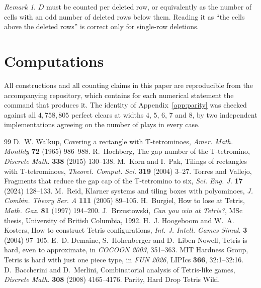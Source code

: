 \documentclass[11pt,a4paper]{article}
\theoremstyle{plain}
\theoremstyle{definition}
\theoremstyle{remark}
\newtheorem{remark}[theorem]{Remark}
\begin{document}
\begin{remark}
$D$ must be counted per deleted row, or equivalently as the number of cells with an
odd number of deleted rows below them. Reading it as ``the cells above the deleted
rows'' is correct only for single-row deletions.
\end{remark}

\section*{Computations}

All constructions and all counting claims in this paper are reproducible from the
accompanying repository, which contains for each numerical statement the command that
produces it. The identity of Appendix~\ref{app:parity} was checked against all
$4{,}758{,}805$ perfect clears at widths $4$, $5$, $6$, $7$ and $8$, by two independent
implementations agreeing on the number of plays in every case.

\begin{thebibliography}{99}
 D.~W. Walkup, Covering a rectangle with T-tetrominoes,
  \emph{Amer. Math. Monthly} \textbf{72} (1965) 986--988.
 R.~Hochberg, The gap number of the T-tetromino,
  \emph{Discrete Math.} \textbf{338} (2015) 130--138.
 M.~Korn and I.~Pak, Tilings of rectangles with T-tetrominoes,
  \emph{Theoret. Comput. Sci.} \textbf{319} (2004) 3--27.
 Torres and Vallejo, Fragments that reduce the gap cap of
  the T-tetromino to six, \emph{Sci. Eng. J.} \textbf{17} (2024) 128--133.
 M.~Reid, Klarner systems and tiling boxes with polyominoes,
  \emph{J. Combin. Theory Ser. A} \textbf{111} (2005) 89--105.
 H.~Burgiel, How to lose at Tetris, \emph{Math. Gaz.}
  \textbf{81} (1997) 194--200.
 J.~Brzustowski, \emph{Can you win at Tetris?},
  MSc thesis, University of British Columbia, 1992.
 H.~J. Hoogeboom and W.~A. Kosters, How to construct Tetris
  configurations, \emph{Int. J. Intell. Games Simul.} \textbf{3} (2004) 97--105.
 E.~D. Demaine, S.~Hohenberger and D.~Liben-Nowell, Tetris is
  hard, even to approximate, in \emph{COCOON 2003}, 351--363.
 MIT Hardness Group, Tetris is hard with just one piece
  type, in \emph{FUN 2026}, LIPIcs \textbf{366}, 32:1--32:16.
 D.~Baccherini and D.~Merlini, Combinatorial analysis of
  Tetris-like games, \emph{Discrete Math.} \textbf{308} (2008) 4165--4176.
 Parity, Hard Drop Tetris Wiki.
\end{thebibliography}
\end{document}
